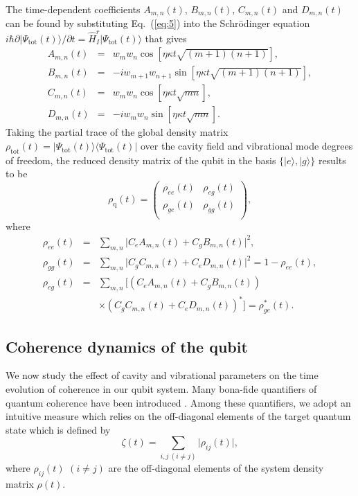 \documentclass[twocolumn,3p,times]{elsarticle}
\newcommand{\ket}[1]{|#1\rangle}
\begin{document}
The time-dependent coefficients $A_{m,n}(t)$, $B_{m,n}(t)$, $C_{m,n}(t)$ and $D_{m,n}(t)$ can be found by substituting Eq.~(\ref{eq:5}) into the Schr\"{o}dinger equation $i\hbar\partial\lvert\Psi_\mathrm{tot}(t)\rangle/\partial t=\hat H_{I}^{r}\lvert\Psi_\mathrm{tot}(t)\rangle$ that gives
\begin{eqnarray}
\label{eq:6} 
A_{m,n}(t)&=& w_{m}w_{n}\cos{[\eta \kappa t\sqrt{(m+1)(n+1)}]}, \nonumber \\
B_{m,n}(t)&=&-iw_{m+1}w_{n+1}\sin{[\eta \kappa t\sqrt{(m+1)(n+1)}]}, \nonumber \\
C_{m,n}(t)&=& w_{m}w_{n}\cos{[\eta \kappa t\sqrt{mn}]}, \nonumber \\
D_{m,n}(t)&=&-iw_{m}w_{n}\sin{[\eta \kappa t\sqrt{mn}]}.
\end{eqnarray} 
Taking the partial trace of the global density matrix $\rho_\mathrm{tot}(t)=\lvert\Psi_\mathrm{tot}(t)\rangle\langle\Psi_\mathrm{tot}(t)\lvert$ over the cavity field and vibrational mode degrees of freedom, the reduced density matrix of the qubit in the basis $\{\ket{e},\ket{g}\}$ results to be
\begin{equation} 
\label{eq:8}  
\rho_\mathrm{q}(t)=\left(\begin{array}{cc} \rho_{ee}(t) &  \rho_{eg}(t) \\ 
 \rho_{ge}(t) &  \rho_{gg}(t)\\ 
\end{array}
\right), 
\end{equation}
where
\begin{eqnarray}
\label{eq:9} 
\rho_{ee}(t) &=&\sum_{m,n}\lvert C_{e}A_{m,n}(t)+C_{g}B_{m,n}(t)\rvert^{2},\nonumber \\
\rho_{gg}(t) &=&\sum_{m,n}\lvert C_{g}C_{m,n}(t)+C_{e}D_{m,n}(t)\rvert^{2}=1-\rho_{ee}(t), \nonumber \\
\rho_{eg}(t) &=&\sum_{m,n}[(C_{e}A_{m,n}(t)+C_{g}B_{m,n}(t))\nonumber\\
&&\times (C_{g}C_{m,n}(t)+C_{e}D_{m,n}(t))^{*}]=\rho_{ge}^\ast(t).
\end{eqnarray} 


\subsection{Coherence dynamics of the qubit}
We now study the effect of cavity and vibrational parameters on the time evolution of coherence in our qubit system. Many bona-fide quantifiers of quantum coherence have been introduced \cite{RevModPhys.89.041003}.
Among these quantifiers, we adopt an intuitive measure which relies on the off-diagonal elements of the target quantum state which is defined by \cite{PRL113140401}
\begin{equation} 
\label{eq:10} 
\zeta(t)=\sum_{i,j\ (i\neq j)}\lvert\rho_{ij}(t)\rvert,
\end{equation}
where $\rho_{ij}(t)$ $(i\neq j)$ are the off-diagonal elements of the system density matrix $\rho (t)$. 
\end{document}
